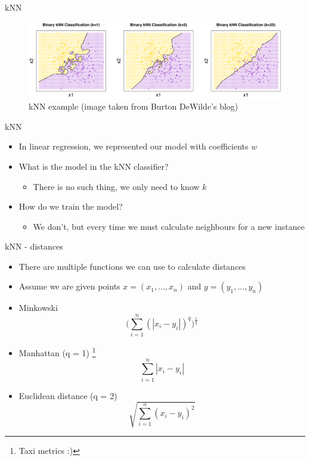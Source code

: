 \documentclass[aspectratio=169]{beamer}
\begin{document}
\begin{frame}{kNN}
    \begin{center}
        \begin{figure}
            \includegraphics[scale=0.27]{./images/knn02.png}
        \caption{kNN example (image taken from Burton DeWilde's blog)}
        \end{figure}
    \end{center}
\end{frame}
\begin{frame}{kNN}
    \begin{itemize}[<+->]
        \item In linear regression, we represented our model with coefficients $w$
        \item What is the  model in the kNN classifier?
            \begin{itemize}
                \item There is no such thing, we only need to know $k$
            \end{itemize}
        \item How do we train the model?
            \begin{itemize}
                \item We don't, but every time we must calculate neighbours for a new instance
            \end{itemize}
    \end{itemize}
\end{frame}
\begin{frame}{kNN - distances}
    \begin{itemize}
        \item There are multiple functions we can use to calculate distances
        \item Assume we are given points $x = (x_1, ..., x_n)$ and $y = (y_1, ..., y_n)$
        \item Minkowski
            $$ \bigg( {\sum_{i=1}^{n} (|x_i - y_i|)^q} \bigg)^\frac{1}{q} $$
        \item Manhattan (q = 1) \footnote{Taxi metrics :)}
            $$ \sum_{i=1}^{n} \left| x_i - y_i \right| $$
        \item Euclidean distance (q = 2)
            $$ \sqrt{\sum_{i=1}^{n} (x_i - y_i)^2} $$
    \end{itemize}
\end{frame}
\end{document}
